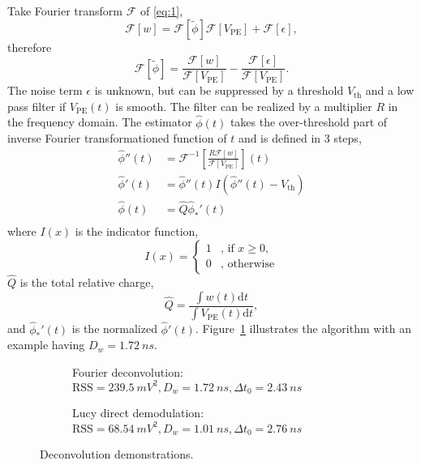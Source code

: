 Take Fourier transform $\mathcal{F}$ of \eqref{eq:1},
\begin{equation}
  \label{eq:fourier}
  \mathcal{F}[w] = \mathcal{F}[\tilde{\phi}]\mathcal{F}[V_\mathrm{PE}] + \mathcal{F}[\epsilon],
\end{equation}
therefore
\begin{equation}
  \label{eq:fdconv}
  \mathcal{F}[\tilde{\phi}] = \frac{\mathcal{F}[w]}{\mathcal{F}[V_\mathrm{PE}]} - \frac{\mathcal{F}[\epsilon]}{\mathcal{F}[V_\mathrm{PE}]}.
\end{equation}
The noise term $\epsilon$ is unknown, but can be suppressed by a threshold $V_\mathrm{th}$ and a low pass filter if $V_\mathrm{PE}(t)$ is smooth.  The filter can be realized by a multiplier $R$ in the frequency domain. The estimator $\hat{\phi}(t)$ takes the over-threshold part of inverse Fourier transformationed function of $t$ and is defined in 3 steps,
\begin{equation}
  \label{eq:fdconv2}
  \begin{aligned}
    \hat{\phi}''(t) & = \mathcal{F}^{-1}\left[\frac{R \mathcal{F}[w]}{\mathcal{F}[V_\mathrm{PE}]}\right](t) \\
    \hat{\phi}'(t) & = \hat{\phi}''(t) I(\hat{\phi}''(t) - V_\mathrm{th}) \\
    \hat{\phi}(t) & = \hat{Q}\hat{\phi}_*'(t) \\
  \end{aligned}
\end{equation}
where $I(x)$ is the indicator function,
\begin{equation}
  \label{eq:id}
  I(x) = \left\{
    \begin{array}{ll}
      1 & \mbox{, if $x\ge0$}, \\
      0 & \mbox{, otherwise}
    \end{array}
    \right.
\end{equation}
$\hat{Q}$ is the total relative charge,
\begin{equation}
  \label{eq:Q}
  \hat{Q} = \frac{\int w(t) \mathrm{d}t}{\int V_\mathrm{PE}(t) \mathrm{d}t},
\end{equation}
and $\hat{\phi}_*'(t)$ is the normalized $\hat{\phi}'(t)$. Figure~\ref{fig:fd} illustrates the algorithm with an example having $D_w = \SI{1.72}{ns}$. 

\begin{figure}[H]
  \begin{subfigure}{0.5\textwidth}
    \centering
    \scalebox{0.36}{}
    \caption{\label{fig:fd}Fourier deconvolution: $\mathrm{RSS}=\SI{239.5}{mV^2},D_w=\SI{1.72}{ns},\Delta t_0=\SI{2.43}{ns}$}
  \end{subfigure}
  \begin{subfigure}{0.5\textwidth}
    \centering
    \scalebox{0.36}{}
    \caption{\label{fig:lucy}Lucy direct demodulation: $\mathrm{RSS}=\SI{68.54}{mV^2},D_w=\SI{1.01}{ns},\Delta t_0=\SI{2.76}{ns}$}
  \end{subfigure}
  \caption{Deconvolution demonstrations.}
\end{figure}

